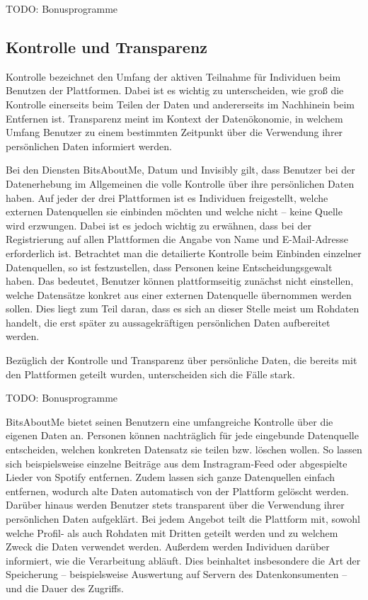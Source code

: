 TODO: Bonusprogramme

\subsection{Kontrolle und Transparenz}
Kontrolle bezeichnet den Umfang der aktiven Teilnahme für Individuen beim Benutzen der Plattformen. Dabei ist es wichtig zu unterscheiden, wie groß die Kontrolle einerseits beim Teilen der Daten und andererseits im Nachhinein beim Entfernen ist. Transparenz meint im Kontext der Datenökonomie, in welchem Umfang Benutzer zu einem bestimmten Zeitpunkt über die Verwendung ihrer persönlichen Daten informiert werden. \newline

\noindent Bei den Diensten BitsAboutMe, Datum und Invisibly gilt, dass Benutzer bei der Datenerhebung im Allgemeinen die volle Kontrolle über ihre persönlichen Daten haben. Auf jeder der drei Plattformen ist es Individuen freigestellt, welche externen Datenquellen sie einbinden möchten und welche nicht -- keine Quelle wird erzwungen. Dabei ist es jedoch wichtig zu erwähnen, dass bei der Registrierung auf allen Plattformen die Angabe von Name und E-Mail-Adresse erforderlich ist. Betrachtet man die detailierte Kontrolle beim Einbinden einzelner Datenquellen, so ist festzustellen, dass Personen keine Entscheidungsgewalt haben. Das bedeutet, Benutzer können plattformseitig zunächst nicht einstellen, welche Datensätze konkret aus einer externen Datenquelle übernommen werden sollen. Dies liegt zum Teil daran, dass es sich an dieser Stelle meist um Rohdaten handelt, die erst später zu aussagekräftigen persönlichen Daten aufbereitet werden. \newline

\noindent Bezüglich der Kontrolle und Transparenz über persönliche Daten, die bereits mit den Plattformen geteilt wurden, unterscheiden sich die Fälle stark. \newline

TODO: Bonusprogramme

\noindent BitsAboutMe bietet seinen Benutzern eine umfangreiche Kontrolle über die eigenen Daten an. Personen können nachträglich für jede eingebunde Datenquelle entscheiden, welchen konkreten Datensatz sie teilen bzw. löschen wollen. So lassen sich beispielsweise einzelne Beiträge aus dem Instragram-Feed oder abgespielte Lieder von Spotify entfernen. Zudem lassen sich ganze Datenquellen einfach entfernen, wodurch alte Daten automatisch von der Plattform gelöscht werden. Darüber hinaus werden Benutzer stets transparent über die Verwendung ihrer persönlichen Daten aufgeklärt. Bei jedem Angebot teilt die Plattform mit, sowohl welche Profil- als auch Rohdaten mit Dritten geteilt werden und zu welchem Zweck die Daten verwendet werden. Außerdem werden Individuen darüber informiert, wie die Verarbeitung abläuft. Dies beinhaltet insbesondere die Art der Speicherung -- beispielsweise Auswertung auf Servern des Datenkonsumenten -- und die Dauer des Zugriffs. \newline

